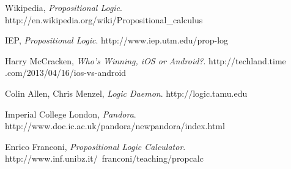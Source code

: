 \documentclass{report}
\begin{document}
\begin{thebibliography}{9}

  Wikipedia,
  \emph{Propositional Logic}.
  http://en.wikipedia.org/wiki/Propositional\_calculus

  IEP,
  \emph{Propositional Logic}.
  http://www.iep.utm.edu/prop-log

  Harry McCracken,
  \emph{Who’s Winning, iOS or Android?}.
  http://techland.time\\.com/2013/04/16/ios-vs-android

  Colin Allen, Chris Menzel,
  \emph{Logic Daemon}.
  http://logic.tamu.edu

  Imperial College London,
  \emph{Pandora}.
  http://www.doc.ic.ac.uk/pandora/newpandora/index.html

  Enrico Franconi,
  \emph{Propositional Logic Calculator}.
  http://www.inf.unibz.it/~franconi/teaching/propcalc

\end{thebibliography}
\end{document}
